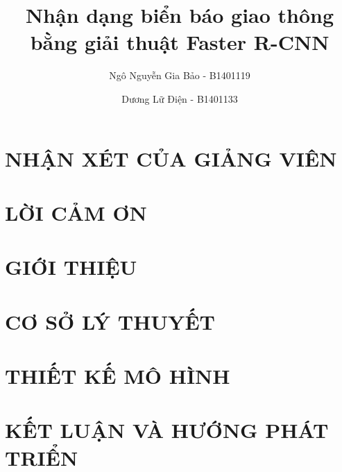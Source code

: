 \documentclass[a4paper,12pt,oneside]{report}
\title{Nhận dạng biển báo giao thông bằng giải thuật Faster R-CNN}						%
\author{Ngô Nguyễn Gia Bảo - B1401119 \and Dương Lữ Điện - B1401133}		%
\begin{document}


\chapter*{NHẬN XÉT CỦA GIẢNG VIÊN}


\chapter*{LỜI CẢM ƠN}


\tableofcontents
\listoffigures
\listoftables

\clearpage
{}	%

\chapter{GIỚI THIỆU}


\chapter{CƠ SỞ LÝ THUYẾT}


\chapter{THIẾT KẾ MÔ HÌNH}


\chapter{KẾT LUẬN VÀ HƯỚNG PHÁT TRIỂN}


% 

{}

\end{document}
